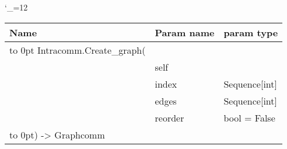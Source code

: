 \begingroup \catcode`\_=12 \tt
\begin{tabular}{lll}
\toprule
\textrm{Name}&\textrm{Param name}&\textrm{param type}\\
\midrule
\hbox to 0pt {Intracomm.Create_graph(\hss}\\
& self\\
& index & Sequence[int]\\
& edges & Sequence[int]\\
& reorder & bool = False\\
\hbox to 0pt{) -> Graphcomm\hss}\\
\bottomrule
\end{tabular}
\endgroup

